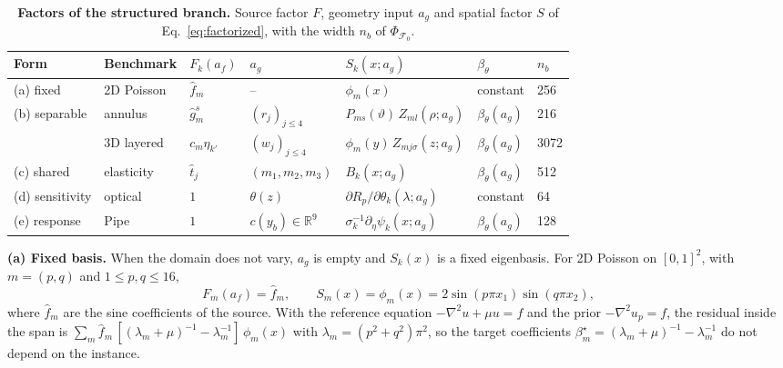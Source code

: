 \documentclass{article}
\begin{document}
\begin{table}[H]
\centering
\setlength{\tabcolsep}{4pt}
\renewcommand{\arraystretch}{0.9}
\caption{\textbf{Factors of the structured branch.} Source factor $F$, geometry input $a_g$
and spatial factor $S$ of Eq.~\ref{eq:factorized}, with the width $n_b$ of $\Phi_{\mathcal F_0}$.}
\label{tab:fac-cases}
\vspace{1mm}
\footnotesize
\begin{tabular}{@{}lllllll@{}}
\toprule
Form & Benchmark & $F_k(a_f)$ & $a_g$ & $S_k(x;a_g)$ & $\beta_\theta$ & $n_b$\\
\midrule
(a) fixed       & 2D Poisson & $\hat f_m$      & --              & $\phi_m(x)$                                  & constant            & 256\\
(b) separable   & annulus    & $\hat g_m^{s}$  & $(r_j)_{j\le4}$ & $P_{ms}(\vartheta)\,Z_{ml}(\rho;a_g)$        & $\beta_\theta(a_g)$ & 216\\
                & 3D layered & $c_m\eta_{k'}$  & $(w_j)_{j\le4}$ & $\phi_m(y)\,Z_{mj\sigma}(z;a_g)$             & $\beta_\theta(a_g)$ & 3072\\
(c) shared      & elasticity & $\hat t_j$      & $(m_1,m_2,m_3)$ & $B_k(x;a_g)$                                 & $\beta_\theta(a_g)$ & 512\\
(d) sensitivity & optical    & $1$             & $\theta(z)$     & $\partial R_p/\partial\theta_k(\lambda;a_g)$ & constant            & 64\\
(e) response    & Pipe       & $1$             & $c(y_b)\in\mathbb{R}^{9}$ & $\sigma_k^{-1}\partial_\eta\psi_k(x;a_g)$ & $\beta_\theta(a_g)$ & 128\\
\bottomrule
\end{tabular}
\vspace{-3mm}
\end{table}

\textbf{(a) Fixed basis.}
When the domain does not vary, $a_g$ is empty and $S_k(x)$ is a fixed eigenbasis. For 2D
Poisson on $[0,1]^2$, with $m=(p,q)$ and $1\le p,q\le 16$,
\begin{equation}
F_m(a_f)=\hat f_m,
\qquad
S_m(x)=\phi_m(x)=2\sin(p\pi x_1)\sin(q\pi x_2),
\label{eq:fac-poisson}
\end{equation}
where $\hat f_m$ are the sine coefficients of the source. With the reference equation
$-\nabla^2u+\mu u=f$ and the prior $-\nabla^2u_p=f$, the residual inside the span is
$\sum_m \hat f_m\,[(\lambda_m+\mu)^{-1}-\lambda_m^{-1}]\,\phi_m(x)$ with
$\lambda_m=(p^2+q^2)\pi^2$, so the target coefficients
$\beta^\star_m=(\lambda_m+\mu)^{-1}-\lambda_m^{-1}$ do not depend on the instance.
\end{document}
